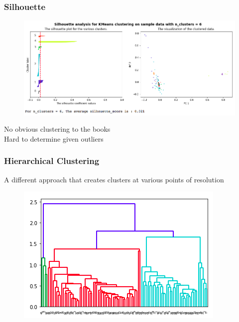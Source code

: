 \documentclass{beamer}
\begin{document}
\begin{frame}
	\frametitle{Silhouette}
	\begin{figure}
		\includegraphics[width=1.0\linewidth]{silhouette6.png}
	\end{figure}
	No obvious clustering to the books\\
	Hard to determine given outliers
\end{frame}

\begin{frame}
	\frametitle{Hierarchical Clustering}
	A different approach that creates clusters at various points of resolution
	\begin{figure}
		\includegraphics[width=.9\linewidth]{uncutdendro.png}
	\end{figure}
\end{frame}
\end{document}
